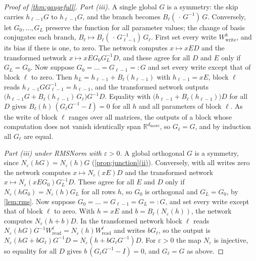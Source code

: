 \documentclass[10pt]{article}
\theoremstyle{definition}
\theoremstyle{remark}
\newcommand{\R}{\mathbb{R}}
\newcommand{\Wread}{W_{\mathrm{read}}}
\newcommand{\Wwrite}{W_{\mathrm{write}}}
\newcommand{\dm}{d_{\mathrm{model}}}
\DeclareRobustCommand{\cpref}[2]{\hyperref[#1:#2]{\cref*{#1}(#2)}}
\begin{document}
\begin{proof}[Proof of \cref{thm:gaugefull}]
\emph{Part (iii).} A single global $G$ is a symmetry: the skip carries $h_{\ell-1}G$ to $h_{\ell-1}G$, and the branch becomes $B_\ell(\,\cdot\,G^{-1})\,G$. Conversely, let $G_0, \dots, G_L$ preserve the function for all parameter values; the change of basis conjugates each branch, $B_\ell \mapsto B_\ell(\,\cdot\,G_{\ell-1}^{-1})\,G_\ell$. First set every write $\Wwrite^{k}$, and its bias if there is one, to zero. The network computes $x \mapsto xED$ and the transformed network $x \mapsto xEG_0G_L^{-1}D$, and these agree for all $D$ and $E$ only if $G_L = G_0$. Now suppose $G_0 = \dots = G_{\ell-1} =: G$ and set every write except that of block $\ell$ to zero. Then $h_L = h_{\ell-1} + B_\ell(h_{\ell-1})$ with $h_{\ell-1} = xE$, block $\ell$ reads $h_{\ell-1}GG_{\ell-1}^{-1} = h_{\ell-1}$, and the transformed network outputs $\big(h_{\ell-1}G + B_\ell(h_{\ell-1})\,G_\ell\big)G^{-1}D$. Equality with $\big(h_{\ell-1} + B_\ell(h_{\ell-1})\big)D$ for all $D$ gives $B_\ell(h)\,(G_\ell G^{-1} - I) = 0$ for all $h$ and all parameters of block $\ell$. As the write of block $\ell$ ranges over all matrices, the outputs of a block whose computation does not vanish identically span $\R^{\dm}$, so $G_\ell = G$, and by induction all $G_\ell$ are equal. 

\emph{Part (iii) under RMSNorm with $\varepsilon > 0$.} A global orthogonal $G$ is a symmetry, since $N_\varepsilon(hG) = N_\varepsilon(h)G$ (\cpref{prop:junction}{ii}). Conversely, with all writes zero the network computes $x \mapsto N_\varepsilon(xE)D$ and the transformed network $x \mapsto N_\varepsilon(xEG_0)G_L^{-1}D$. These agree for all $E$ and $D$ only if $N_\varepsilon(hG_0) = N_\varepsilon(h)G_L$ for all rows $h$, so $G_0$ is orthogonal and $G_L = G_0$, by \cref{lem:rms}. Now suppose $G_0 = \dots = G_{\ell-1} = G_L =: G$, and set every write except that of block $\ell$ to zero. With $h = xE$ and $b = B_\ell(N_\varepsilon(h))$, the network computes $N_\varepsilon(h + b)D$. In the transformed network block $\ell$ reads $N_\varepsilon(hG)G^{-1}\Wread^{\ell} = N_\varepsilon(h)\Wread^{\ell}$ and writes $bG_\ell$, so the output is $N_\varepsilon(hG + bG_\ell)G^{-1}D = N_\varepsilon(h + bG_\ell G^{-1})D$. For $\varepsilon > 0$ the map $N_\varepsilon$ is injective, so equality for all $D$ gives $b\,(G_\ell G^{-1} - I) = 0$, and $G_\ell = G$ as above.


\end{proof}
\end{document}
